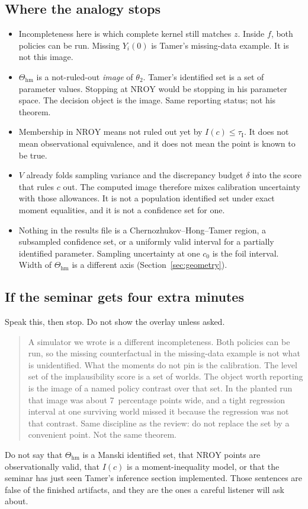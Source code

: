 \documentclass[11pt]{article}
\newcommand{\NROY}{\mathrm{NROY}}
\newcommand{\hm}{\mathrm{hm}}
\newcommand{\thr}{\tau_{\mathrm{I}}}
\begin{document}
\subsection{Where the analogy stops}
\begin{itemize}
  \item Incompleteness here is which complete kernel still matches \(z\).
        Inside \(f\), both policies can be run. Missing \(Y_i(0)\) is
        Tamer's missing-data example. It is not this image.
  \item \(\Theta_{\hm}\) is a not-ruled-out \emph{image} of \(\theta_2\).
        Tamer's identified set is a set of parameter values. Stopping
        at \(\NROY\) would be stopping in his parameter space. The
        decision object is the image. Same reporting status; not his
        theorem.
  \item Membership in \(\NROY\) means not ruled out yet by \(I(c)\le\thr\).
        It does not mean observational equivalence, and it does not mean
        the point is known to be true.
  \item \(V\) already folds sampling variance and the discrepancy budget
        \(\delta\) into the score that rules \(c\) out. The computed
        image therefore mixes calibration uncertainty with those
        allowances. It is not a population identified set under exact
        moment equalities, and it is not a confidence set for one.
  \item Nothing in the results file is a Chernozhukov--Hong--Tamer
        region, a subsampled confidence set, or a uniformly valid
        interval for a partially identified parameter. Sampling
        uncertainty at one \(c_0\) is the foil interval. Width of
        \(\Theta_{\hm}\) is a different axis
        (Section~\ref{sec:geometry}).
\end{itemize}

\subsection{If the seminar gets four extra minutes}
Speak this, then stop. Do not show the overlay unless asked.

\begin{quote}
A simulator we wrote is a different incompleteness. Both policies can
be run, so the missing counterfactual in the missing-data example is
not what is unidentified. What the moments do not pin is the
calibration. The level set of the implausibility score is a set of
worlds. The object worth reporting is the image of a named policy
contrast over that set. In the planted run that image was about
7~percentage points wide, and a tight regression interval at one
surviving world missed it because the regression was not that
contrast. Same discipline as the review: do not replace the set by a
convenient point. Not the same theorem.
\end{quote}

Do not say that \(\Theta_{\hm}\) is a Manski identified set, that
\(\NROY\) points are observationally valid, that \(I(c)\) is a
moment-inequality model, or that the seminar has just seen Tamer's
inference section implemented. Those sentences are false of the
finished artifacts, and they are the ones a careful listener will ask
about.
\end{document}
